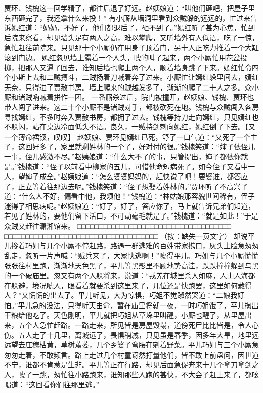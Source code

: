 \documentclass[12pt,oneside]{book}
\begin{document}
贾环、钱槐这一回学精了，都往后退了好远。赵姨娘道：“叫他们砸吧，把屋子里东西砸完了，我还拿什么来投！”
有小厮从墙洞里看到众贼躲的远远的，忙过来告诉嫣红道：“奶奶，不好了，他们都退后了，砸不到了。”嫣红听了甚为心焦，忙到后院来察看，却见墙头足有两人之高，难以攀爬，又听墙外有人低语，吃了一惊，急忙赶往前院来。只见那十个小厮仍在用身子顶着门，另十人正吃力推着一个大缸滚到门边。
嫣红忽见墙上露着一个人头，唬的叫了起来，两个小厮忙用花盆投掷，把那人又逼了回去，谁知后墙也爬上两个人，顺着墙身跳了下来。嫣红忙令四个小斯上去和二贼搏斗，二贼扬着刀喊着奔了过来。小厮忙让嫣红躲里间去，嫣红无奈，只得进了贾赦书房。墙上爬来的贼越发多了，渐渐的爬了二十人之多。众小厮和诸贼吶喊着拼作一团。
一番厮杀过后，院门被撞开，赵姨娘、钱槐、贾环也带人闯了进来。这二十个小厮不是诸贼对手，都被砍死在地。钱槐与众贼闯入各房寻找嫣红，不多时奔入贾赦书房，都拥了过去。钱槐等持刀走向嫣红，只见嫣红也不躲闪，站在桌边冷面低头不语。良久，一贼持剑刺向嫣红，嫣红倒了下去。【又一个薄命裙钗，叹叹】
赵姨娘、贾环见嫣红已死，舒了一口气道：“又死了一个主子，这回好多了，家里就剩姓林的一个了，好对付的很。”钱槐笑道：“婶子依侄儿一事，侄儿感激不尽。”赵姨娘道：“什么大不了的事，只管提出，婶子都依你就是。”钱槐道：“侄子以前看中柳家的五儿，可惜他命短病死了。如今侄子又看中一人，望婶子成全。”赵姨娘道：“怎么婆婆妈妈的，赶快说了吧！要娶谁，都答应了，正立等着往那边去呢。”钱槐笑道：“侄子想娶着姓林的。”贾环听了不高兴了道：“什么人不好，偏看中他，我烦他！”钱槐道：“林姑娘那容貌世间稀有，侄子迷得了相思病呢。”赵姨娘道：“好了，好了，答应你了，马上就告诉兄弟们知道，若见了姓林的，要他们留下活口，不可动毫毛就是了。”钱槐道：“就是如此！”于是众贼又赶往潇湘馆来。
□□□□□□□□□□□□□□□□□□□□□□□□□□□□□□□□□□□□
□□□□□□□□□□□□□□□□□□□□□□□□□□□□□□□□□□□□
（按：缺失一页文字）
却说平儿搀着巧姐与几个小厮不停赶路，路遇一群逃难的百姓带家携口，灰头土脸急匆匆乱走，忽听一片声喊：“贼兵来了，大家快逃啊！”唬得平儿、巧姐与几个小厮慌慌张张往村里跑，渐渐地天色黑了，平儿等黑影里不顾地势高洼，跌跌撞撞躲到乌黑的一个破庙里。忽又有两个人躲将来，说道：“戎羌在城里杀人如麻，人山人海都在躲避，境况唬人，眼看着就要杀到这里来了，几位还是快跑罢，这里如何藏得人？”又慌慌的出去了。平儿听见，大为惊惧，巧姐不觉踧然哭道：“二娘我好怕。”平儿急的没法，只得听天由命，暂在庙里将就一夜，一时巧姐饿了，平儿掏出干粮给他吃了。天色刚明，平儿就把巧姐从草垛里叫醒，小厮也醒了，从里屋出来，五个人急忙赶路。一路走来，所见皆是房屋毁塌，道傍死尸比比皆是，令人心伤。五人走了十几里，离城远了，畏惧稍减，只见虽是春季，因多年大旱，地里远远望去庄稼枯黄，草树蔫萎，几个乡婆子弯腰在剜着野菜。平儿巧姐与三个小厮急匆匆走着，不敢频言。路上走过几个村童讶然打量他们，皆不敢上前盘问，因世道不宁，谁都不肯惹是生非。平儿等正在行路，却见后面急促奔来十几个拿刀拿剑之人，唬了一跳，匆忙往小路跑来，谁知那些人跑的甚快，不大会子赶上来了，都吆喝道：“这回看你们往那里逃。”
\end{document}
